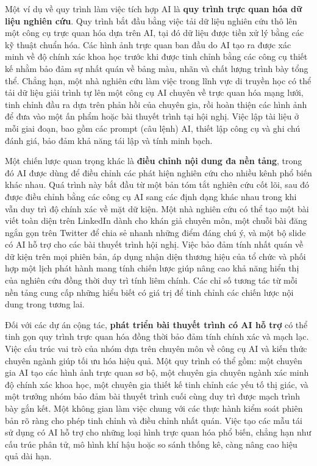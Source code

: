 Một ví dụ về quy trình làm việc tích hợp AI là \textbf{quy trình trực quan hóa dữ liệu nghiên cứu}. Quy trình bắt đầu bằng việc tải dữ liệu nghiên cứu thô lên một công cụ trực quan hóa dựa trên AI, tại đó dữ liệu được tiền xử lý bằng các kỹ thuật chuẩn hóa. Các hình ảnh trực quan ban đầu do AI tạo ra được xác minh về độ chính xác khoa học trước khi được tinh chỉnh bằng các công cụ thiết kế nhằm bảo đảm sự nhất quán về bảng màu, nhãn và chất lượng trình bày tổng thể. Chẳng hạn, một nhà nghiên cứu làm việc trong lĩnh vực di truyền học có thể tải dữ liệu giải trình tự lên một công cụ AI chuyên về trực quan hóa mạng lưới, tinh chỉnh đầu ra dựa trên phản hồi của chuyên gia, rồi hoàn thiện các hình ảnh để đưa vào một ấn phẩm hoặc bài thuyết trình tại hội nghị. Việc lập tài liệu ở mỗi giai đoạn, bao gồm các prompt (câu lệnh) AI, thiết lập công cụ và ghi chú đánh giá, bảo đảm khả năng tái lập và tính minh bạch.

Một chiến lược quan trọng khác là \textbf{điều chỉnh nội dung đa nền tảng}, trong đó AI được dùng để điều chỉnh các phát hiện nghiên cứu cho nhiều kênh phổ biến khác nhau. Quá trình này bắt đầu từ một bản tóm tắt nghiên cứu cốt lõi, sau đó được điều chỉnh bằng các công cụ AI sang các định dạng khác nhau trong khi vẫn duy trì độ chính xác về mặt dữ kiện. Một nhà nghiên cứu có thể tạo một bài viết toàn diện trên LinkedIn dành cho khán giả chuyên môn, một chuỗi bài đăng ngắn gọn trên Twitter để chia sẻ nhanh những điểm đáng chú ý, và một bộ slide có AI hỗ trợ cho các bài thuyết trình hội nghị. Việc bảo đảm tính nhất quán về dữ kiện trên mọi phiên bản, áp dụng nhận diện thương hiệu của tổ chức và phối hợp một lịch phát hành mang tính chiến lược giúp nâng cao khả năng hiển thị của nghiên cứu đồng thời duy trì tính liêm chính. Các chỉ số tương tác từ mỗi nền tảng cung cấp những hiểu biết có giá trị để tinh chỉnh các chiến lược nội dung trong tương lai.

Đối với các dự án cộng tác, \textbf{phát triển bài thuyết trình có AI hỗ trợ} có thể tinh gọn quy trình trực quan hóa đồng thời bảo đảm tính chính xác và mạch lạc. Việc cấu trúc vai trò của nhóm dựa trên chuyên môn về công cụ AI và kiến thức chuyên ngành giúp tối ưu hóa hiệu quả. Một quy trình có thể gồm: một chuyên gia AI tạo các hình ảnh trực quan sơ bộ, một chuyên gia chuyên ngành xác minh độ chính xác khoa học, một chuyên gia thiết kế tinh chỉnh các yếu tố thị giác, và một trưởng nhóm bảo đảm bài thuyết trình cuối cùng duy trì được mạch trình bày gắn kết. Một không gian làm việc chung với các thực hành kiểm soát phiên bản rõ ràng cho phép tinh chỉnh và điều chỉnh nhất quán. Việc tạo các mẫu tái sử dụng có AI hỗ trợ cho những loại hình trực quan hóa phổ biến, chẳng hạn như cấu trúc phân tử, mô hình khí hậu hoặc so sánh thống kê, càng nâng cao hiệu quả dài hạn.

